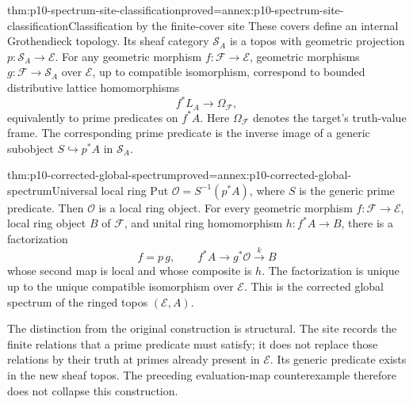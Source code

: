 \begin{hbtheorem}{thm:p10-spectrum-site-classification}{proved=annex:p10-spectrum-site-classification}{Classification by the finite-cover site}
These covers define an internal Grothendieck topology.
Its sheaf category \(\mathcal S_A\) is a topos with geometric
projection \(p:\mathcal S_A\to\mathcal E\).
For any geometric morphism \(f:\mathcal F\to\mathcal E\),
geometric morphisms \(g:\mathcal F\to\mathcal S_A\) over
\(\mathcal E\), up to compatible isomorphism, correspond to
bounded distributive lattice homomorphisms
\[
 f^*L_A\longrightarrow\Omega_{\mathcal F},
\]
equivalently to prime predicates on \(f^*A\).
Here \(\Omega_{\mathcal F}\) denotes the target's truth-value frame.
The corresponding prime predicate is the inverse image of a
generic subobject \(S\hookrightarrow p^*A\) in \(\mathcal S_A\).
\end{hbtheorem}

\begin{hbtheorem}{thm:p10-corrected-global-spectrum}{proved=annex:p10-corrected-global-spectrum}{Universal local ring}
Put \(\mathcal O=S^{-1}(p^*A)\), where \(S\) is the generic
prime predicate. Then \(\mathcal O\) is a local ring object.
For every geometric morphism \(f:\mathcal F\to\mathcal E\),
local ring object \(B\) of \(\mathcal F\), and unital ring
homomorphism \(h:f^*A\to B\), there is a factorization
\[
 f=p\,g,\qquad
 f^*A\longrightarrow g^*\mathcal O
          \xrightarrow{\ k\ }B
\]
whose second map is local and whose composite is \(h\).
The factorization is unique up to the unique compatible
isomorphism over \(\mathcal E\).
This is the corrected global spectrum of the ringed topos
\((\mathcal E,A)\).
\end{hbtheorem}

The distinction from the original construction is structural.
The site records the finite relations that a prime predicate must
satisfy; it does not replace those relations by their truth at primes
already present in \(\mathcal E\). Its generic predicate exists in
the new sheaf topos. The preceding evaluation-map counterexample
therefore does not collapse this construction.
